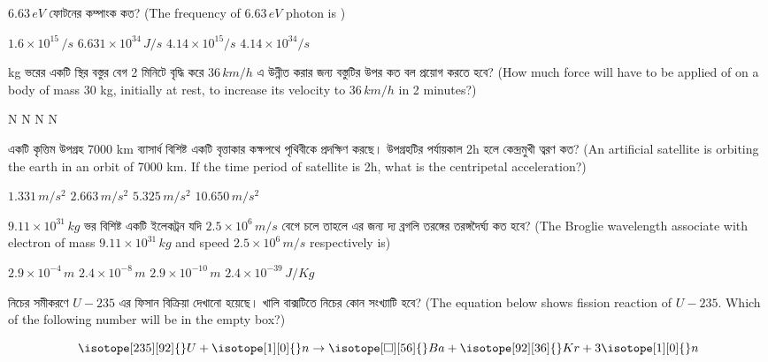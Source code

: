 \documentclass[addpoints]{exam}
\begin{document}
\begin{questions}
\question $ 6.63\,eV $ ফোটনের কম্পাংক কত? (The frequency of $ 6.63\,eV $ photon is )

\begin{oneparchoices}
\choice $ 1.6\times 10^{15}\,/s $
\choice  $ 6.631\times 10^{34}\,J/s $
\choice  $ 4.14\times 10^{15}/s $
\choice  $ 4.14\times 10^{34}/s $
\end{oneparchoices}

 kg ভরের একটি স্থির বস্তুর বেগ 2 মিনিটে বৃদ্ধি করে $ 36\,km/h $ এ উন্নীত করার জন্য বস্তুটির উপর কত বল প্রয়োগ করতে হবে? (How much force will have to be applied of on a body of mass 30 kg, initially at rest, to increase its velocity to $ 36\,km/h $ in 2 minutes?)

\begin{oneparchoices}
 N
 N
 N
 N

\end{oneparchoices}


\question একটি কৃত্তিম উপগ্রহ 7000 km ব্যাসার্ধ বিশিষ্ট একটি বৃত্তাকার কক্ষপথে পৃথিবীকে প্রদক্ষিণ করছে। উপগ্রহটির পর্যায়কাল 2h হলে কেন্দ্রমুখী ত্বরণ কত? (An artificial satellite is orbiting the earth in an orbit of 7000 km. If the time period of satellite is 2h, what is the centripetal acceleration?)

\begin{oneparchoices}
\choice $ 1.331\,m/s^{2} $
\choice $ 2.663\,m/s^{2} $
\choice $ 5.325\,m/s^{2} $
\choice $ 10.650\,m/s^{2} $
\end{oneparchoices}



\question $ 9.11\times 10^{31}\,kg $ ভর বিশিষ্ট একটি ইলেকট্রন যদি $ 2.5\times 10^{6}\,m/s $ বেগে চলে তাহলে এর জন্য দ্য ব্রগলি তরঙ্গের তরঙ্গদৈর্ঘ্য কত হবে? (The Broglie wavelength associate with electron of mass $ 9.11\times 10^{31}\,kg $ and speed $ 2.5\times 10^{6}\,m/s $ respectively is)

\begin{oneparchoices}
\choice $ 2.9\times 10^{-4}\,m $
\choice $ 2.4\times 10^{-8}\,m $
\choice $ 2.9\times 10^{-10}\,m $
\choice $ 2.4\times 10^{-39}\,J/Kg $
\end{oneparchoices}

\question  নিচের সমীকরণে $ U-235 $ এর ফিসান বিক্রিয়া দেখানো হয়েছে। খালি বাক্সটিতে নিচের কোন সংখ্যাটি হবে? (The equation below shows fission reaction of $ U-235 $. Which of the following number will be in the empty box?)

\[ \isotope[235][92]{}U+  \isotope[1][0]{}n \to \isotope[\square][56]{}Ba + \isotope[92][36]{}Kr + 3\isotope[1][0]{}n \]


\end{questions}
\end{document}
